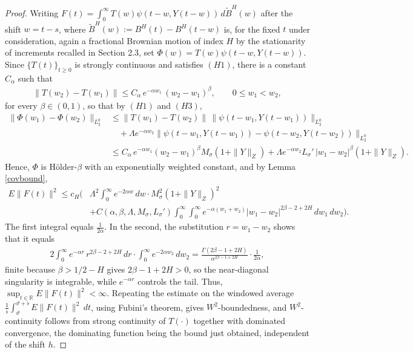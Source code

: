 \documentclass[11pt]{amsart}
\begin{document}
\begin{proof}
Writing $F(t)=\int_0^\infty T(w)\psi(t-w,Y(t-w))\,d\widetilde B^H(w)$ after the shift $w=t-s$, where $\widetilde B^H(w):=B^H(t)-B^H(t-w)$ is, for the fixed $t$ under consideration, again a fractional Brownian motion of index $H$ by the stationarity of increments recalled in Section 2.3, set $\Phi(w)=T(w)\psi(t-w,Y(t-w))$. Since $\{T(t)\}_{t\ge0}$ is strongly continuous and satisfies $(H1)$, there is a constant $C_\alpha$ such that
\begin{align*}
\|T(w_2)-T(w_1)\|\le C_\alpha\,e^{-\alpha w_1}\,(w_2-w_1)^{\beta},\qquad 0\le w_1<w_2,
\end{align*}
for every $\beta\in(0,1)$, so that by $(H1)$ and $(H3)$,
\begin{align*}
\|\Phi(w_1)-\Phi(w_2)\|_{L^0_2}
&\le \|T(w_1)-T(w_2)\|\,\|\psi(t-w_1,Y(t-w_1))\|_{L^0_2}\\
&\quad+\Lambda e^{-\alpha w_2}\|\psi(t-w_1,Y(t-w_1))-\psi(t-w_2,Y(t-w_2))\|_{L^0_2}\\
&\le C_\alpha\,e^{-\alpha w_1}(w_2-w_1)^{\beta}M_\sigma(1+\|Y\|_Z)
+\Lambda e^{-\alpha w_2}L_\sigma'\,|w_1-w_2|^{\beta}(1+\|Y\|_Z).
\end{align*}
Hence, $\Phi$ is H\"older-$\beta$ with an exponentially weighted constant, and by Lemma \ref{covbound},
\begin{align*}
E\|F(t)\|^2\le c_H\bigg(&\Lambda^2\int_0^\infty e^{-2\alpha w}\,dw\cdot M_\sigma^2(1+\|Y\|_Z)^2\\
&+C(\alpha,\beta,\Lambda,M_\sigma,L_\sigma')\int_0^\infty\int_0^\infty e^{-\alpha(w_1+w_2)}|w_1-w_2|^{2\beta-2+2H}\,dw_1\,dw_2\bigg).
\end{align*}
The first integral equals $\frac1{2\alpha}$. In the second, the substitution $r=w_1-w_2$ shows that it equals
\begin{align*}
2\int_0^\infty e^{-\alpha r}\,r^{2\beta-2+2H}\,dr\cdot\int_0^\infty e^{-2\alpha w_2}\,dw_2
=\frac{\Gamma(2\beta-1+2H)}{\alpha^{2\beta-1+2H}}\cdot\frac1{2\alpha},
\end{align*}
finite because $\beta>1/2-H$ gives $2\beta-1+2H>0$, so the near-diagonal singularity is integrable, while $e^{-\alpha r}$ controls the tail. Thus, $\sup_{t\in\mathbb R}E\|F(t)\|^2<\infty$. Repeating the estimate on the windowed average $\frac1\flat\int_\vartheta^{\vartheta+\flat}E\|F(t)\|^2\,dt$, using Fubini's theorem, gives $W^2$-boundedness, and $W^2$-continuity follows from strong continuity of $T(\cdot)$ together with dominated convergence, the dominating function being the bound just obtained, independent of the shift $h$.
\end{proof}
\end{document}
